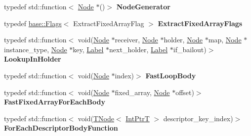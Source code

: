 \begin{DoxyCompactItemize}
typedef std\+::function$<$ \mbox{\hyperlink{classv8_1_1internal_1_1compiler_1_1Node}{Node}} $\ast$()$>$ {\bfseries Node\+Generator}
\item 
\mbox{\label{classv8_1_1internal_1_1CodeStubAssembler_a737ba7bd60314733ac427533252965a6}} 
typedef \mbox{\hyperlink{classv8_1_1base_1_1Flags}{base\+::\+Flags}}$<$ Extract\+Fixed\+Array\+Flag $>$ {\bfseries Extract\+Fixed\+Array\+Flags}
\item 
\mbox{\label{classv8_1_1internal_1_1CodeStubAssembler_aae1d0b4058a21472ce7483804e8b4247}} 
typedef std\+::function$<$ void(\mbox{\hyperlink{classv8_1_1internal_1_1compiler_1_1Node}{Node}} $\ast$receiver, \mbox{\hyperlink{classv8_1_1internal_1_1compiler_1_1Node}{Node}} $\ast$holder, \mbox{\hyperlink{classv8_1_1internal_1_1compiler_1_1Node}{Node}} $\ast$map, \mbox{\hyperlink{classv8_1_1internal_1_1compiler_1_1Node}{Node}} $\ast$instance\+\_\+type, \mbox{\hyperlink{classv8_1_1internal_1_1compiler_1_1Node}{Node}} $\ast$key, \mbox{\hyperlink{classv8_1_1internal_1_1compiler_1_1CodeAssemblerLabel}{Label}} $\ast$next\+\_\+holder, \mbox{\hyperlink{classv8_1_1internal_1_1compiler_1_1CodeAssemblerLabel}{Label}} $\ast$if\+\_\+bailout)$>$ {\bfseries Lookup\+In\+Holder}
\item 
\mbox{\label{classv8_1_1internal_1_1CodeStubAssembler_ae13070a3f4edb6d2348822d1ba6a14c8}} 
typedef std\+::function$<$ void(\mbox{\hyperlink{classv8_1_1internal_1_1compiler_1_1Node}{Node}} $\ast$index)$>$ {\bfseries Fast\+Loop\+Body}
\item 
\mbox{\label{classv8_1_1internal_1_1CodeStubAssembler_acba842a144f0299addf93dee905af619}} 
typedef std\+::function$<$ void(\mbox{\hyperlink{classv8_1_1internal_1_1compiler_1_1Node}{Node}} $\ast$fixed\+\_\+array, \mbox{\hyperlink{classv8_1_1internal_1_1compiler_1_1Node}{Node}} $\ast$offset)$>$ {\bfseries Fast\+Fixed\+Array\+For\+Each\+Body}
\item 
\mbox{\label{classv8_1_1internal_1_1CodeStubAssembler_a1b49b0c3ee0bfcc3f9caf1cbd2ac67c8}} 
typedef std\+::function$<$ void(\mbox{\hyperlink{classv8_1_1internal_1_1compiler_1_1TNode}{T\+Node}}$<$ \mbox{\hyperlink{structv8_1_1internal_1_1IntPtrT}{Int\+PtrT}} $>$ descriptor\+\_\+key\+\_\+index)$>$ {\bfseries For\+Each\+Descriptor\+Body\+Function}

\end{DoxyCompactItemize}
